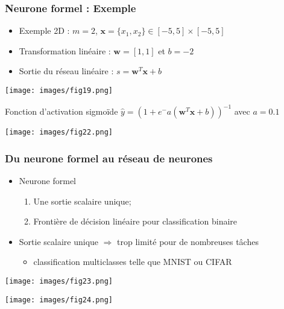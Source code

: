 \documentclass[9pt]{beamer}
\newcommand \ve[1]{\mathbf{#1}}
\begin{document}
\begin{frame}
\frametitle {Neurone formel : Exemple}

\begin{minipage}[c]{0.7\linewidth}
\begin{itemize}
\item Exemple 2D : $m=2$, $\ve{x}=\{x_1, x_2\}\in[-5,5]\times[-5,5]$
\item Transformation linéaire : $\ve{w}=[1,1]$ et $b=-2$
\item Sortie du réseau linéaire : $s=\ve{w}^T\ve{x}+b$
\end{itemize}
\end{minipage} \hfill
\begin{minipage}[l]{0.25\linewidth}
\texttt{[image: images/fig19.png]}
\end{minipage}
\begin{block}{
Fonction d'activation sigmoïde $\hat{y}=\left(1+e^-a{\left(\ve{w}^T\ve{x}+b\right)}\right)^{-1}$ avec $a=0.1$}

\begin{center}
\texttt{[image: images/fig22.png]}
\end{center}
\end{block}

\end{frame}

\begin{frame}
\frametitle{Du neurone formel au réseau de neurones}
\begin{minipage}[l]{0.5\linewidth}
\begin{itemize}
\item Neurone formel
\begin{enumerate}
\item Une sortie scalaire unique;
\item Frontière de décision linéaire pour classification binaire
\end{enumerate}
\item Sortie scalaire unique $\Rightarrow$ trop limité pour de nombreuses tâches
\begin{itemize}
\item classification multiclasses telle que MNIST ou CIFAR
\end{itemize} 
\end{itemize}
\end{minipage}
\begin{minipage}[c]{0.4\linewidth}
\texttt{[image: images/fig23.png]}
\end{minipage}

\begin{center}
\texttt{[image: images/fig24.png]}
\end{center}
\end{frame}
\end{document}
